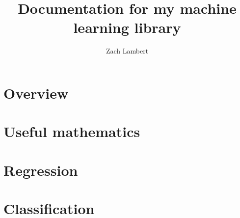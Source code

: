 \documentclass[10pt]{article}
\title{Documentation for my machine learning library}
\author{Zach Lambert}
\begin{document}
\begin{centering}
\huge{\@title}

\large{\@author}

\end{centering}


\section{Overview}


\section{Useful mathematics}


\section{Regression}


\section{Classification}

\end{document}
